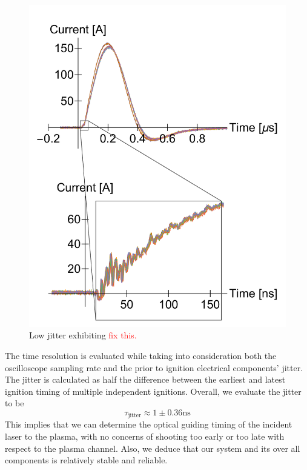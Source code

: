 \documentclass[../main.tex]{subfiles}
\begin{document}
\begin{figure}
    \centering
    \includegraphics[width=\textwidth]{figures/jitter/low_jitter.pdf}
    \caption{Low jitter exhibiting \textcolor{red}{fix this.}}
    \label{fig:low_jitter}
\end{figure}

The time resolution is evaluated while taking into consideration both the oscilloscope sampling rate and the prior to ignition electrical components' jitter. The jitter is calculated as half the difference between the earliest and latest ignition timing of multiple independent ignitions. Overall, we evaluate the jitter to be
\begin{equation}
	\tau_\text{jitter}\approx 1\pm 0.36\si{\ns}
\end{equation}
This implies that we can determine the optical guiding timing of the incident laser to the plasma, with no concerns of shooting too early or too late with respect to the plasma channel. Also, we deduce that our system and its over all components is relatively stable and reliable.
\end{document}
